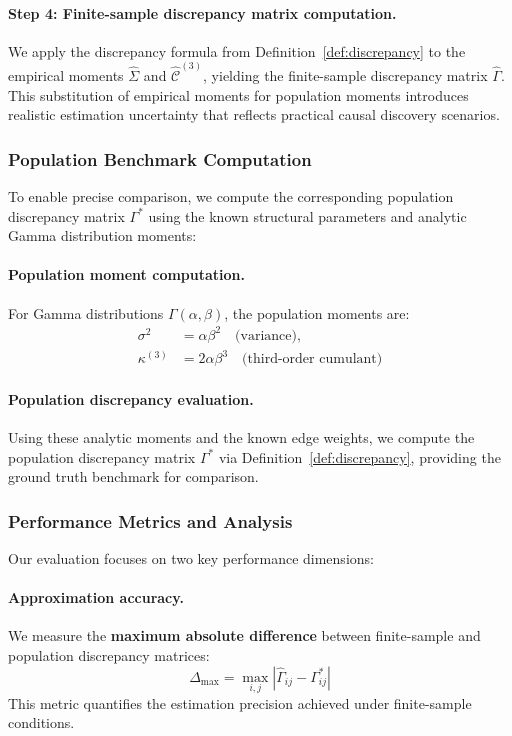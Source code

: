 \documentclass[11pt,a4paper]{article}
\numberwithin{equation}{section}
\begin{document}
\paragraph{Step 4: Finite-sample discrepancy matrix computation.} We apply the discrepancy formula from Definition~\ref{def:discrepancy} to the empirical moments $\hat{\Sigma}$ and $\hat{\mathcal{C}}^{(3)}$, yielding the finite-sample discrepancy matrix $\hat{\Gamma}$. This substitution of empirical moments for population moments introduces realistic estimation uncertainty that reflects practical causal discovery scenarios.

\subsubsection{Population Benchmark Computation}

To enable precise comparison, we compute the corresponding population discrepancy matrix $\Gamma^*$ using the known structural parameters and analytic Gamma distribution moments:

\paragraph{Population moment computation.} For Gamma distributions $\Gamma(\alpha, \beta)$, the population moments are:
\begin{align}
\sigma^2 &= \alpha \beta^2 \quad \text{(variance)}, \\
\kappa^{(3)} &= 2\alpha \beta^3 \quad \text{(third-order cumulant)}
\end{align}

\paragraph{Population discrepancy evaluation.} Using these analytic moments and the known edge weights, we compute the population discrepancy matrix $\Gamma^*$ via Definition~\ref{def:discrepancy}, providing the ground truth benchmark for comparison.

\subsubsection{Performance Metrics and Analysis}

Our evaluation focuses on two key performance dimensions:

\paragraph{Approximation accuracy.} We measure the \textbf{maximum absolute difference} between finite-sample and population discrepancy matrices:
\begin{equation}
\Delta_{\max} = \max_{i,j} |\hat{\Gamma}_{ij} - \Gamma^*_{ij}|
\end{equation}
This metric quantifies the estimation precision achieved under finite-sample conditions.
\end{document}
